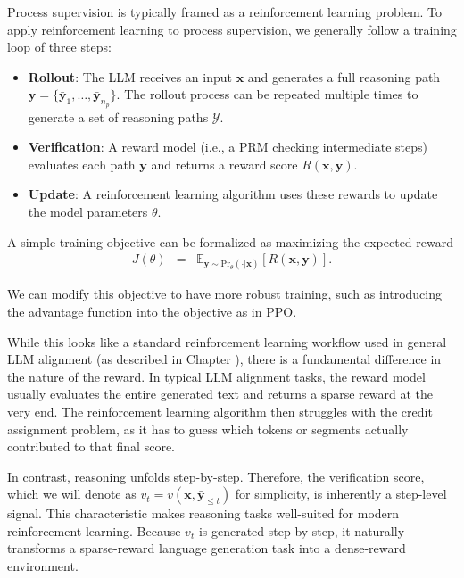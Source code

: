 Process supervision is typically framed as a reinforcement learning problem. To apply reinforcement learning to process supervision, we generally follow a training loop of three steps:

\begin{itemize}
\item \textbf{Rollout}: The LLM receives an input $\mathbf{x}$ and generates a full reasoning path $\mathbf{y} = \{\bar{\mathbf{y}}_1, \dots, \bar{\mathbf{y}}_{n_p}\}$. The rollout process can be repeated multiple times to generate a set of reasoning paths $\mathcal{Y}$.
\item \textbf{Verification}: A reward model (i.e., a PRM checking intermediate steps) evaluates each path $\mathbf{y}$ and returns a reward score $R(\mathbf{x}, \mathbf{y})$.
\item \textbf{Update}: A reinforcement learning algorithm uses these rewards to update the model parameters $\theta$.
\end{itemize}

A simple training objective can be formalized as maximizing the expected reward
\begin{eqnarray}
J(\theta) & = & \mathbb{E}_{\mathbf{y} \sim \mathrm{Pr}_{\theta}(\cdot|\mathbf{x})} \left[ R(\mathbf{x}, \mathbf{y}) \right]. \label{eq:simple-rl-objective-for-reasoning}
\end{eqnarray}

\noindent We can modify this objective to have more robust training, such as introducing the advantage function into the objective as in PPO.

While this looks like a standard reinforcement learning workflow used in general LLM alignment (as described in Chapter \ChapterLLMTuning), there is a fundamental difference in the nature of the reward. In typical LLM alignment tasks, the reward model usually evaluates the entire generated text and returns a sparse reward at the very end. The reinforcement learning algorithm then struggles with the credit assignment problem, as it has to  guess which tokens or segments actually contributed to that final score.

In contrast, reasoning unfolds step-by-step. Therefore, the verification score, which we will denote as $v_t = v(\mathbf{x}, \bar{\mathbf{y}}_{\le t})$ for simplicity, is inherently a step-level signal. This characteristic makes reasoning tasks well-suited for modern reinforcement learning. Because $v_t$ is generated step by step, it naturally transforms a sparse-reward language generation task into a dense-reward environment.

